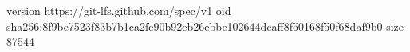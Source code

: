 version https://git-lfs.github.com/spec/v1
oid sha256:8f9be7523f83b7b1ca2fe90b92eb26ebbe102644deaff8f50168f50f68daf9b0
size 87544
